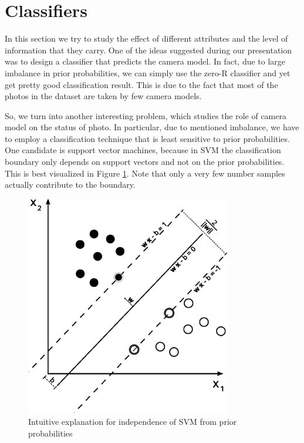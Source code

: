 \documentclass[letter,12pt]{article}
\begin{document}
\section{Classifiers}

\label{sec:classifier}

In this section we try to study the effect of different attributes
and the level of information that they carry. One of the ideas suggested
during our presentation was to design a classifier that predicts the
camera model. In fact, due to large imbalance in prior probabilities,
we can simply use the zero-R classifier and yet get pretty good classification
result. This is due to the fact that most of the photos in the dataset
are taken by few camera models.

So, we turn into another interesting problem, which studies the role
of camera model on the status of photo. In particular, due to mentioned
imbalance, we have to employ a classification technique that is least
sensitive to prior probabilities. One candidate is support vector
machines, because in SVM the classification boundary only depends
on support vectors and not on the prior probabilities. This is best
visualized in Figure \ref{Flo:SVM_balance}. Note that only a very
few number samples actually contribute to the boundary.

%
\begin{figure}
\centering
\includegraphics[width=0.8\textwidth]{Svm_max_sep_hyperplane_with_margin.png}
\caption{Intuitive explanation for independence of SVM from prior probabilities}
\label{Flo:SVM_balance}
\end{figure}
\end{document}
